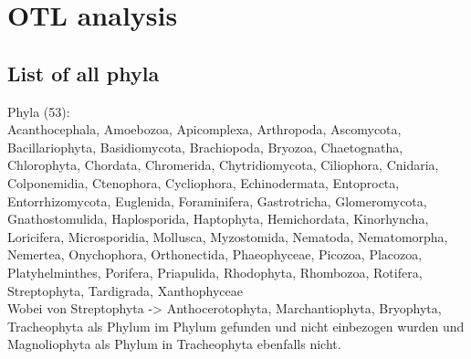   \section{OTL analysis}\label{sec:otl analysis}

    \subsection{List of all phyla}\label{subsec:listPhyla}

    Phyla (53): \\
    Acanthocephala, Amoebozoa, Apicomplexa, Arthropoda, Ascomycota, Bacillariophyta, Basidiomycota, 
      Brachiopoda, Bryozoa, Chaetognatha, Chlorophyta, Chordata, Chromerida, Chytridiomycota, 
      Ciliophora, Cnidaria, Colponemidia, Ctenophora, Cycliophora, Echinodermata, Entoprocta, 
      Entorrhizomycota, Euglenida, Foraminifera, Gastrotricha, Glomeromycota, Gnathostomulida, 
      Haplosporida, Haptophyta, Hemichordata, Kinorhyncha, Loricifera, Microsporidia, Mollusca, 
      Myzostomida, Nematoda, Nematomorpha, Nemertea, Onychophora, Orthonectida, Phaeophyceae, 
      Picozoa, Placozoa, Platyhelminthes, Porifera, Priapulida, Rhodophyta, Rhombozoa, Rotifera, 
      Streptophyta, Tardigrada, Xanthophyceae \\
    Wobei von Streptophyta -> Anthocerotophyta, Marchantiophyta, Bryophyta, Tracheophyta als
      Phylum im Phylum gefunden und nicht einbezogen wurden und Magnoliophyta als Phylum in 
      Tracheophyta ebenfalls nicht. \\

